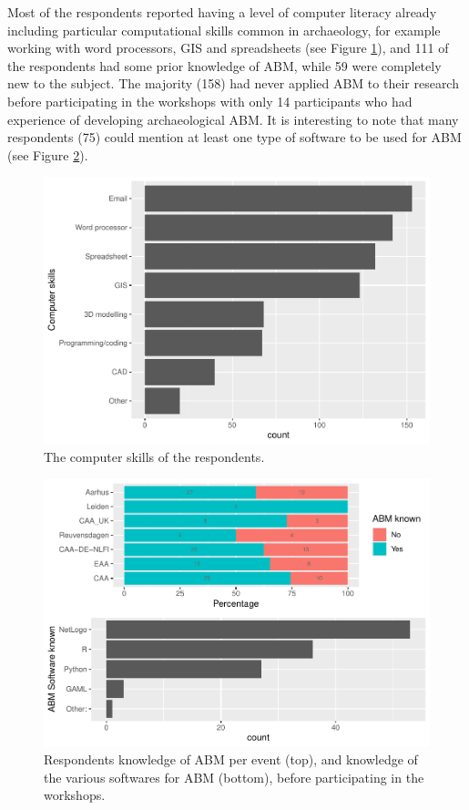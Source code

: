 \documentclass[
]{article}
\begin{document}
Most of the respondents reported having a level of computer literacy already including particular computational skills common in archaeology, for example working with word processors, GIS and spreadsheets (see Figure \ref{fig:computer-skills}), and 111 of the respondents had some prior knowledge of ABM, while 59 were completely new to the subject. The majority (158) had never applied ABM to their research before participating in the workshops with only 14 participants who had experience of developing archaeological ABM. It is interesting to note that many respondents (75) could mention at least one type of software to be used for ABM (see Figure \ref{fig:abm-knowledge}).

\begin{figure}
\includegraphics[width=0.5\linewidth]{paper_files/figure-latex/computer-skills-1} \caption{The computer skills of the respondents.}\label{fig:computer-skills}
\end{figure}

\begin{figure}
\centering
\includegraphics{paper_files/figure-latex/abm-knowledge-1.pdf}
\caption{\label{fig:abm-knowledge}Respondents knowledge of ABM per event (top), and knowledge of the various softwares for ABM (bottom), before participating in the workshops.}
\end{figure}
\end{document}
